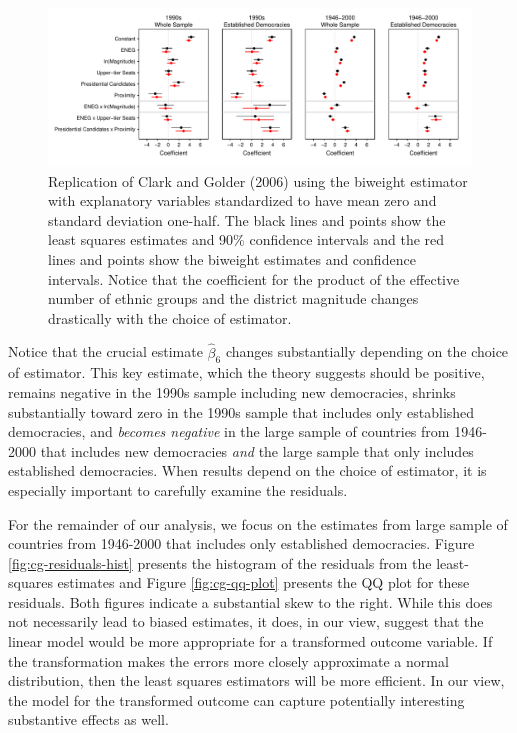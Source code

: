 \documentclass[12pt]{article}
\begin{document}
\begin{figure}[H]
\begin{center}
\includegraphics[scale = .8]{figs/cg-coef-plots.pdf}
\caption{Replication of Clark and Golder (2006) using the biweight estimator with explanatory variables standardized to have mean zero and standard deviation one-half. The black lines and points show the least squares estimates and 90\% confidence intervals and the red lines and points show the biweight estimates and confidence intervals. Notice that the coefficient for the product of the effective number of ethnic groups and the district magnitude changes drastically with the choice of estimator.}\label{fig:cg-coef-plots}
\end{center}
\end{figure}

Notice that the crucial estimate $\hat{\beta}_6$ changes substantially depending on the choice of estimator. This key estimate, which the theory suggests should be positive, remains negative in the 1990s sample including new democracies, shrinks substantially toward zero in the 1990s sample that includes only established democracies, and \textit{becomes negative} in the large sample of countries from 1946-2000 that includes new democracies \textit{and} the large sample that only includes established democracies. When results depend on the choice of estimator, it is especially important to carefully examine the residuals.

For the remainder of our analysis, we focus on the estimates from large sample of countries from 1946-2000 that includes only established democracies. Figure \ref{fig:cg-residuals-hist} presents the histogram of the residuals from the least-squares estimates and Figure \ref{fig:cg-qq-plot} presents the QQ plot for these residuals. Both figures indicate a substantial skew to the right. While this does not necessarily lead to biased estimates, it does, in our view, suggest that the linear model would be more appropriate for a transformed outcome variable. If the transformation makes the errors more closely approximate a normal distribution, then the least squares estimators will be more efficient. In our view, the model for the transformed outcome can capture potentially interesting substantive effects as well.
\end{document}
